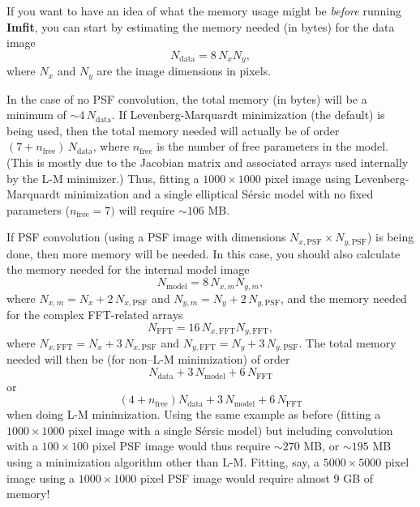 \documentclass[10pt,a4paper,article]{memoir}
\newcommand{\imfit}{\textbf{Imfit}}
\begin{document}
If you want to have an idea of what the memory usage might be
\textit{before} running \imfit, you can start by estimating the memory needed (in bytes) for the
data image
\begin{equation}
N_{\mathrm{data}} = 8 \, N_{x} N_{y},
\end{equation}
where $N_{x}$ and $N_{y}$ are the image dimensions in pixels. 

In the case of no PSF convolution, the total memory (in bytes)
will be a minimum of $\sim 4 \, N_{\mathrm{data}}$. If Levenberg-Marquardt
minimization (the default) is being used, then the total memory needed
will actually be of order $(7 + n_{\mathrm{free}}) \, N_{\mathrm{data}}$, where
$n_{\mathrm{free}}$ is the number of free parameters in the model. (This is
mostly due to the Jacobian matrix and associated arrays used
internally by the L-M minimizer.) Thus, fitting a $1000 \times 1000$
pixel image using Levenberg-Marquardt minimization and a single
elliptical S\'ersic model with no fixed parameters ($n_{\mathrm{free}} = 7)$
will require $\sim 106$ MB.

If PSF convolution (using a PSF image with dimensions $N_{x,\mathrm{PSF}} \times N_{y,\mathrm{PSF}}$)
is being done, then more memory will be needed. In this case, you should also calculate the 
memory needed for the internal model image
\begin{equation}
N_{\mathrm{model}} = 8 \, N_{x,m} N_{y,m},
\end{equation}
where $N_{x,m} = N_{x} + 2 \, N_{x,\mathrm{PSF}}$ and $N_{y,m} = N_{y} + 2 \, N_{y,\mathrm{PSF}}$,
and the memory needed for the complex FFT-related arrays
\begin{equation}
N_{\mathrm{FFT}} = 16 \, N_{x,\mathrm{FFT}} N_{y,\mathrm{FFT}},
\end{equation}
where $N_{x,\mathrm{FFT}} = N_{x} + 3 \, N_{x,\mathrm{PSF}}$ and 
$N_{y,\mathrm{FFT}} = N_{y} + 3 \, N_{y,\mathrm{PSF}}$. The total memory needed will
then be (for non--L-M minimization) of order
\begin{equation}
N_{\mathrm{data}} + 3 \, N_{\mathrm{model}} + 6 \, N_{\mathrm{FFT}}
\end{equation}
or
\begin{equation}
(4 + n_{\mathrm{free}}) N_{\mathrm{data}} + 3 \, N_{\mathrm{model}} + 6 \, N_{\mathrm{FFT}}
\end{equation}
when doing L-M minimization. Using the same example as before (fitting a
$1000 \times 1000$ pixel image with a single S\'ersic model) but
including convolution with a $100 \times 100$ pixel PSF image would thus
require $\sim 270$ MB, or $\sim 195$ MB using a minimization algorithm other than L-M.
Fitting, say, a $5000 \times 5000$ pixel image using a $1000 \times
1000$ pixel PSF image would require almost 9 GB of memory!
\end{document}

